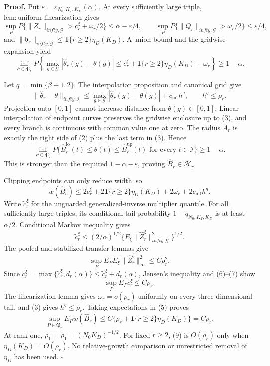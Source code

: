 \textbf{Proof.}
Put \(\varepsilon=\varepsilon_{N_0,K_T,K_D}(\alpha)\). At every sufficiently large triple, \(\mathrm{lem:uniform\mbox{-}linearization}\) gives
\[
 \sup_PP\{\|Z_r\|_{infty,\mathcal G}>c_r^\xi+\omega_r/2\}
 \le\alpha-\varepsilon/4,
 \qquad
 \sup_PP\{\|Q_r\|_{infty,\mathcal G}>\omega_r/2\}
 \le\varepsilon/4,                                        \tag{1}
\]
and \(\|\mathfrak b_r\|_{infty,\mathcal G}\le\mathbf1\{r\ge2\}\eta_D(K_D)\). A union bound and the gridwise expansion yield
\[
 \inf_{P\in\mathfrak P_r}P\left\{
 \max_{g\in\mathcal G}|\widehat\theta_r(g)-\theta(g)|
 \le c_r^\xi+\mathbf1\{r\ge2\}\eta_D(K_D)+\omega_r
 \right\}\ge1-\alpha.                                    \tag{2}
\]

Let \(q=\min\{\beta+1,2\}\). The interpolation proposition and canonical grid give
\[
 \|\widehat\theta_r-\theta\|_{infty,\mathcal I}
 \le\max_{g\in\mathcal G}|\widehat\theta_r(g)-\theta(g)|
 +c_{\mathrm{int}}h^q,
 \qquad h^q\le\rho_r.                                     \tag{3}
\]
Projection onto \([0,1]\) cannot increase distance from \(\theta(g)\in[0,1]\). Linear interpolation of endpoint curves preserves the gridwise enclosure up to (3), and every branch is continuous with common value one at zero. The radius \(A_r\) is exactly the right side of (2) plus the last term in (3). Hence
\[
 \inf_{P\in\mathfrak P_r}P\{\widehat B_r^{\mathrm{lo}}(t)
 \le\theta(t)\le\widehat B_r^{\mathrm{up}}(t)
 \text{ for every }t\in\mathcal I\}\ge1-\alpha.         \tag{4}
\]
This is stronger than the required \(1-\alpha-\varepsilon\), proving \(\widehat B_r\in\mathcal H_r\).

Clipping endpoints can only reduce width, so
\[
 w(\widehat B_r)
 \le2c_r^\xi+2\mathbf1\{r\ge2\}\eta_D(K_D)
 +2\omega_r+2c_{\mathrm{int}}h^q.                         \tag{5}
\]
Write \(\widetilde c_r^\xi\) for the unguarded generalized-inverse multiplier quantile. For all sufficiently large triples, its conditional tail probability \(1-q_{N_0,K_T,K_D}\) is at least \(\alpha/2\). Conditional Markov inequality gives
\[
 \widetilde c_r^\xi
 \le(2/\alpha)^{1/2}
 \{E_\xi\|\widehat Z_r^\xi\|_{infty,\mathcal G}^2\}^{1/2}. \tag{6}
\]
The pooled and stabilized transfer lemmas give
\[
 \sup_PE_PE_\xi\|\widehat Z_r^\xi\|_\infty^2\le C\rho_r^2. \tag{7}
\]
Since \(c_r^\xi=\max\{\widetilde c_r^\xi,d_r(\alpha)\}\le\widetilde c_r^\xi+d_r(\alpha)\), Jensen's inequality and (6)--(7) show
\[
 \sup_PE_Pc_r^\xi\le C\rho_r.                             \tag{8}
\]
The linearization lemma gives \(\omega_r=o(\rho_r)\) uniformly on every three-dimensional tail, and (3) gives \(h^q\le\rho_r\). Taking expectations in (5) proves
\[
 \sup_{P\in\mathfrak P_r}E_Pw(\widehat B_r)
 \le C\{\rho_r+\mathbf1\{r\ge2\}\eta_D(K_D)\}
 =C\bar\rho_r.                                             \tag{9}
\]
At rank one, \(\bar\rho_1=\rho_1=(N_0K_D)^{-1/2}\). For fixed \(r\ge2\), (9) is \(O(\rho_r)\) only when \(\eta_D(K_D)=O(\rho_r)\). No relative-growth comparison or unrestricted removal of \(\eta_D\) has been used. \(\square\)